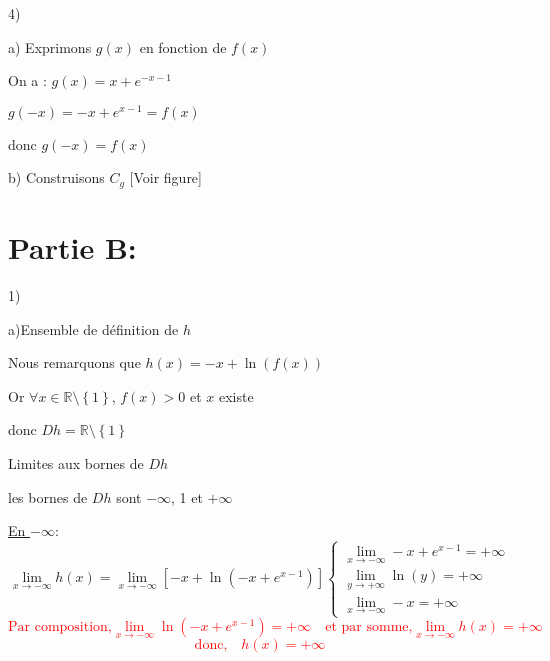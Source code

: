 \documentclass[12pt]{article}
\begin{document}
4)

a) Exprimons $g(x)$ en fonction de $f(x)$

On a : $g(x)=x+e^{-x-1}$

$g(-x)=-x+e^{x-1}=f(x)$

donc $g(-x)=f(x)$

 b) Construisons $C_{g}$ [Voir figure]
 
 \section*{Partie B:}
 1)

	a)Ensemble de définition de $h$

Nous remarquons que 	$h(x)=-x+\ln(f(x))$

Or $\forall x\in \mathbb{R}\setminus\left\lbrace 1\right\rbrace $, $f(x)>0$ et $x$ existe

donc $Dh=\mathbb{R}\setminus\left\lbrace 1\right\rbrace $

Limites aux bornes de $Dh$

les bornes de $Dh$ sont $-\infty$, 1 et $+\infty$

\underline{En $-\infty$}:
\begin{equation*}
\lim_{x \to -\infty}h(x)=\lim_{x \to -\infty}\left[ -x+\ln(-x+e^{x-1})\right] 
\begin{cases}
\lim_{x \to -\infty} -x+e^{x-1}=+\infty\\
\lim_{y \to +\infty}\ln(y)=+\infty\\
\lim_{x \to -\infty}-x=+\infty
\end{cases}
\end{equation*}
\textcolor{red}{\[\text{Par composition,}\lim_{x \to -\infty}\ln(-x+e^{x-1})=+\infty\quad\text{et par somme,}\lim_{x \to -\infty}h(x)=+\infty\]} 
\textcolor{red}{\[\text{donc,}\quad h(x)=+\infty\]}
\end{document}
